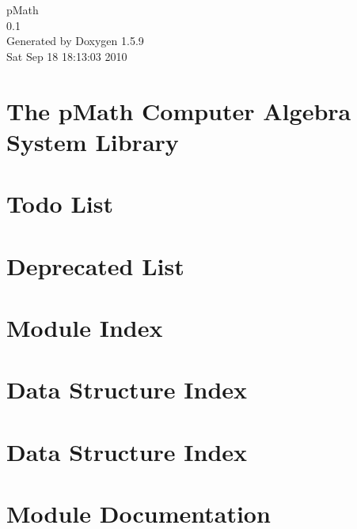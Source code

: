 \documentclass[a4paper]{article}
\begin{document}
\hypersetup{pageanchor=false}
\begin{titlepage}
\vspace*{7cm}
\begin{center}
{\Large pMath \\[1ex]\large 0.1 }\\
\vspace*{1cm}
{\large Generated by Doxygen 1.5.9}\\
\vspace*{0.5cm}
{\small Sat Sep 18 18:13:03 2010}\\
\end{center}
\end{titlepage}
\tableofcontents
{}
\hypersetup{pageanchor=true}
\section{The pMath Computer Algebra System Library}
\label{index}\hypertarget{index}{}
\section{Todo List}
\label{todo}
\hypertarget{todo}{}

\section{Deprecated List}
\label{deprecated}
\hypertarget{deprecated}{}

\section{Module Index}

\section{Data Structure Index}

\section{Data Structure Index}

\section{Module Documentation}



















\end{document}
